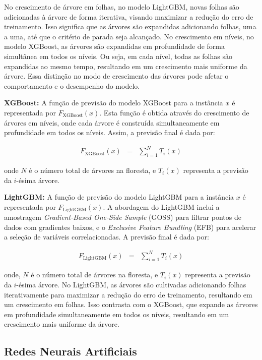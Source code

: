  
 No crescimento de árvore em folhas, no modelo LightGBM, novas folhas são adicionadas à árvore de forma iterativa, visando maximizar a redução do erro de treinamento. Isso significa que as árvores são expandidas adicionando folhas, uma a uma, até que o critério de parada seja alcançado.  No crescimento em níveis, no modelo XGBoost, as árvores são expandidas em profundidade de forma simultânea em todos os níveis. Ou seja, em cada nível, todas as folhas são expandidas ao mesmo tempo, resultando em um crescimento mais uniforme da árvore. Essa distinção no modo de crescimento das árvores pode afetar o comportamento e o desempenho do modelo. 
  
 \noindent\textbf{XGBoost:} 
 A função de previsão do modelo XGBoost para a instância $x$ é representada por $F_{\text{XGBoost}}(x)$. Esta função é obtida através do crescimento de árvores em níveis, onde cada árvore é construída simultaneamente em profundidade em todos os níveis. Assim, a previsão final é dada por:
 
 \begin{eqnarray}
 F_{\text{XGBoost}}(x) &=& \sum_{i=1}^{N} T_i(x)
 \end{eqnarray}
 
 \noindent onde $N$ é o número total de árvores na floresta, e $T_i(x)$ representa a previsão da $i$-ésima árvore.
 
\noindent\textbf{LightGBM:} 
 A função de previsão do modelo LightGBM para a instância $x$ é representada por $F_{\text{LightGBM}}(x)$. A abordagem do LightGBM inclui a amostragem \textit{Gradient-Based One-Side Sample} (GOSS) para filtrar pontos de dados com gradientes baixos, e o \textit{Exclusive Feature Bundling} (EFB) para acelerar a seleção de variáveis correlacionadas. A previsão final é dada por:
 

\begin{eqnarray}
	 F_{\text{LightGBM}}(x) &=& \sum_{i=1}^{N} T_i(x)
\end{eqnarray}

 
 \noindent onde, $N$ é o número total de árvores na floresta, e $T_i(x)$ representa a previsão da $i$-ésima árvore. No LightGBM, as árvores são cultivadas adicionando folhas iterativamente para maximizar a redução do erro de treinamento, resultando em um crescimento em folhas. Isso contrasta com o XGBoost, que expande as árvores em profundidade simultaneamente em todos os níveis, resultando em um crescimento mais uniforme da árvore.
  
  
 \subsection{Redes Neurais Artificiais}
 
